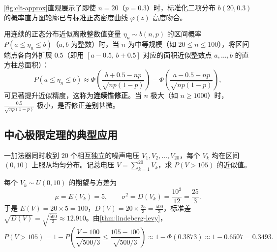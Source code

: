 \cref{fig:clt-approx}直观展示了即使 $n=20$（$p=0.3$）时，标准化二项分布 $b(20,0.3)$ 的概率直方图轮廓已与标准正态密度曲线 $\varphi(z)$ 高度吻合。


\begin{remark}[离散变量正态近似的连续性修正]
用连续的正态分布近似离散整数值变量 $\eta_n\sim b(n,p)$ 的区间概率 $P(a\le\eta_n\le b)$（$a,b$ 为整数）时，当 $n$ 为中等规模（如 $20\le n\le 100$），将区间端点各向外扩展 $0.5$（即用 $[a-0.5,\,b+0.5]$ 对应的面积近似整数点 $a,\ldots,b$ 的直方柱总面积）：
\[
  P(a\le\eta_n\le b)\approx\Phi\!\left(\frac{b+0.5-np}{\sqrt{np(1-p)}}\right)-\Phi\!\left(\frac{a-0.5-np}{\sqrt{np(1-p)}}\right),
\]
可显著提升近似精度，这称为\textbf{连续性修正}。当 $n$ 极大（如 $n\ge 1000$）时，$\frac{0.5}{\sqrt{np(1-p)}}$ 极小，是否修正差别甚微。
\end{remark}

\subsection{中心极限定理的典型应用}

\begin{example}[title={独立噪声电压之和的概率近似}]
\label{eg:noise-voltage}
一加法器同时收到 $20$ 个相互独立的噪声电压 $V_1,V_2,\ldots,V_{20}$，每个 $V_k$ 均在区间 $(0,10)$ 上服从均匀分布。记总电压 $V=\sum_{k=1}^{20}V_k$，求 $P(V>105)$ 的近似值。
\begin{solution}
每个 $V_k\sim U(0,10)$ 的期望与方差为
\[
  \mu=E(V_k)=5,\qquad \sigma^2=D(V_k)=\frac{10^2}{12}=\frac{25}{3}.
\]
于是 $E(V)=20\times 5=100$，$D(V)=20\times\frac{25}{3}=\frac{500}{3}$，标准差 $\sqrt{D(V)}=\sqrt{\frac{500}{3}}\approx 12.910$。由\cref{thm:lindeberg-levy}，
\[
  P(V>105)=1-P\!\left(\frac{V-100}{\sqrt{500/3}}\le\frac{105-100}{\sqrt{500/3}}\right)
  \approx 1-\Phi(0.3873)\approx 1-0.6507=0.3493.
\]
\end{solution}
\end{example}

